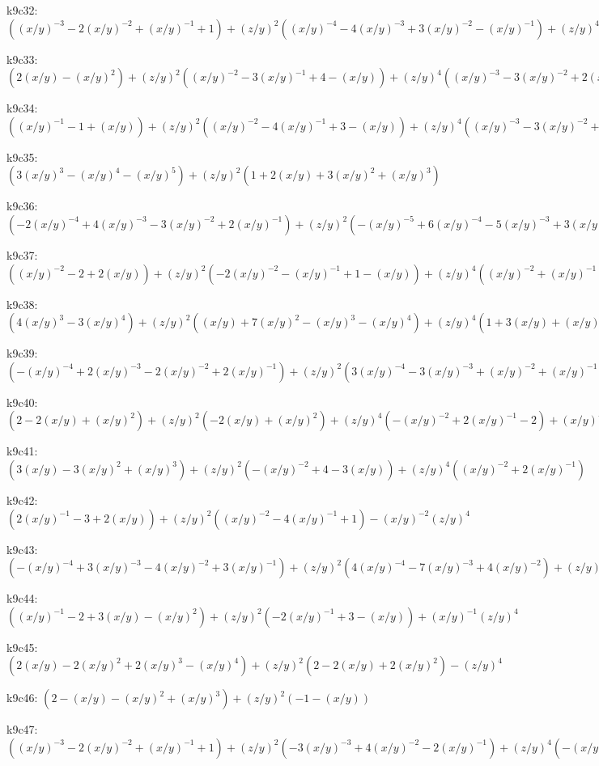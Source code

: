 k9c32: $ ((x/y)^{-3}-2(x/y)^{-2}+(x/y)^{-1}+1)  +(z/y)^{2}((x/y)^{-4}-4(x/y)^{-3}+3(x/y)^{-2}-(x/y)^{-1})  +(z/y)^{4}(-2(x/y)^{-4}+3(x/y)^{-3}-(x/y)^{-2})  +(x/y)^{-4}(z/y)^{6} $ 

k9c33: $ (2(x/y)-(x/y)^{2})  +(z/y)^{2}((x/y)^{-2}-3(x/y)^{-1}+4-(x/y))  +(z/y)^{4}((x/y)^{-3}-3(x/y)^{-2}+2(x/y)^{-1})  -(x/y)^{-3}(z/y)^{6} $ 

k9c34: $ ((x/y)^{-1}-1+(x/y))  +(z/y)^{2}((x/y)^{-2}-4(x/y)^{-1}+3-(x/y))  +(z/y)^{4}((x/y)^{-3}-3(x/y)^{-2}+2(x/y)^{-1})  -(x/y)^{-3}(z/y)^{6} $ 

k9c35: $ (3(x/y)^{3}-(x/y)^{4}-(x/y)^{5})  +(z/y)^{2}(1+2(x/y)+3(x/y)^{2}+(x/y)^{3}) $ 

k9c36: $ (-2(x/y)^{-4}+4(x/y)^{-3}-3(x/y)^{-2}+2(x/y)^{-1})  +(z/y)^{2}(-(x/y)^{-5}+6(x/y)^{-4}-5(x/y)^{-3}+3(x/y)^{-2})  +(z/y)^{4}(2(x/y)^{-5}-4(x/y)^{-4}+(x/y)^{-3})  -(x/y)^{-5}(z/y)^{6} $ 

k9c37: $ ((x/y)^{-2}-2+2(x/y))  +(z/y)^{2}(-2(x/y)^{-2}-(x/y)^{-1}+1-(x/y))  +(z/y)^{4}((x/y)^{-2}+(x/y)^{-1}) $ 

k9c38: $ (4(x/y)^{3}-3(x/y)^{4})  +(z/y)^{2}((x/y)+7(x/y)^{2}-(x/y)^{3}-(x/y)^{4})  +(z/y)^{4}(1+3(x/y)+(x/y)^{2}) $ 

k9c39: $ (-(x/y)^{-4}+2(x/y)^{-3}-2(x/y)^{-2}+2(x/y)^{-1})  +(z/y)^{2}(3(x/y)^{-4}-3(x/y)^{-3}+(x/y)^{-2}+(x/y)^{-1})  +(z/y)^{4}(-2(x/y)^{-4}-(x/y)^{-3}) $ 

k9c40: $ (2-2(x/y)+(x/y)^{2})  +(z/y)^{2}(-2(x/y)+(x/y)^{2})  +(z/y)^{4}(-(x/y)^{-2}+2(x/y)^{-1}-2)  +(x/y)^{-2}(z/y)^{6} $ 

k9c41: $ (3(x/y)-3(x/y)^{2}+(x/y)^{3})  +(z/y)^{2}(-(x/y)^{-2}+4-3(x/y))  +(z/y)^{4}((x/y)^{-2}+2(x/y)^{-1}) $ 

k9c42: $ (2(x/y)^{-1}-3+2(x/y))  +(z/y)^{2}((x/y)^{-2}-4(x/y)^{-1}+1)  -(x/y)^{-2}(z/y)^{4} $ 

k9c43: $ (-(x/y)^{-4}+3(x/y)^{-3}-4(x/y)^{-2}+3(x/y)^{-1})  +(z/y)^{2}(4(x/y)^{-4}-7(x/y)^{-3}+4(x/y)^{-2})  +(z/y)^{4}((x/y)^{-5}-5(x/y)^{-4}+(x/y)^{-3})  -(x/y)^{-5}(z/y)^{6} $ 

k9c44: $ ((x/y)^{-1}-2+3(x/y)-(x/y)^{2})  +(z/y)^{2}(-2(x/y)^{-1}+3-(x/y))  +(x/y)^{-1}(z/y)^{4} $ 

k9c45: $ (2(x/y)-2(x/y)^{2}+2(x/y)^{3}-(x/y)^{4})  +(z/y)^{2}(2-2(x/y)+2(x/y)^{2})  -(z/y)^{4} $ 

k9c46: $ (2-(x/y)-(x/y)^{2}+(x/y)^{3})  +(z/y)^{2}(-1-(x/y)) $ 

k9c47: $ ((x/y)^{-3}-2(x/y)^{-2}+(x/y)^{-1}+1)  +(z/y)^{2}(-3(x/y)^{-3}+4(x/y)^{-2}-2(x/y)^{-1})  +(z/y)^{4}(-(x/y)^{-4}+4(x/y)^{-3}-(x/y)^{-2})  +(x/y)^{-4}(z/y)^{6} $ 

